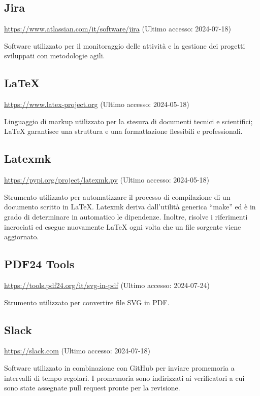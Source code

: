 \subsection{Jira}
\par \href{https://www.atlassian.com/it/software/jira}{https://www.atlassian.com/it/software/jira} (Ultimo accesso: 2024-07-18)
\par Software utilizzato per il monitoraggio delle attività e la gestione dei progetti sviluppati con metodologie agili.
    
\subsection{LaTeX}
\par \href{https://www.latex-project.org}{https://www.latex-project.org} (Ultimo accesso: 2024-05-18)
\par Linguaggio di markup utilizzato per la stesura di documenti tecnici e scientifici; LaTeX garantisce una struttura e una formattazione flessibili e professionali.
    
\subsection{Latexmk}
\par \href{https://pypi.org/project/latexmk.py/}{https://pypi.org/project/latexmk.py} (Ultimo accesso: 2024-05-18)
\par Strumento utilizzato per automatizzare il processo di compilazione di un documento scritto in LaTeX. Latexmk deriva dall'utilità generica “make” ed è in grado di determinare in automatico le dipendenze. Inoltre, risolve i riferimenti incrociati ed esegue nuovamente LaTeX ogni volta che un file sorgente viene aggiornato.

\subsection{PDF24 Tools}
\par \href{https://tools.pdf24.org/it/svg-in-pdf}{https://tools.pdf24.org/it/svg-in-pdf} (Ultimo accesso: 2024-07-24)
\par Strumento utilizzato per convertire file SVG in PDF.

\subsection{Slack}
\par \href{https://slack.com}{https://slack.com} (Ultimo accesso: 2024-07-18)
\par Software utilizzato in combinazione con GitHub per inviare promemoria a intervalli di tempo regolari. I promemoria sono indirizzati ai verificatori a cui sono state assegnate pull request pronte per la revisione.


